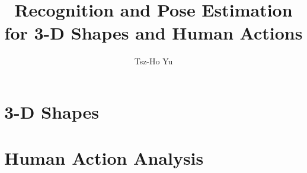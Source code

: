 \documentclass[a4paper, 12pt]{class/thyuthesis}
\title{Recognition and Pose Estimation for 3-D Shapes and Human Actions}
\author{Tsz-Ho Yu}
\begin{document}

\setcounter{secnumdepth}{3}
\setcounter{tocdepth}{3}

\frontmatter
{}

%
%


\mainmatter



\part{3-D Shapes}

%
%
%

\part{Human Action Analysis}

%
%
%
%

% 

\backmatter
\appendix
%


\renewcommand{\bibname}{References} 
 
\end{document}
